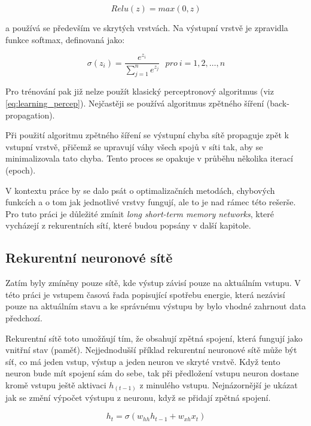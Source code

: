 \documentclass[FM,BP,fonts]{tulthesis}
\begin{document}
\begin{equation}
	Relu(z) = max(0, z)
\end{equation}

a používá se především ve skrytých vrstvách. \cite{brownlee2019gentle} Na výstupní vrstvě je zpravidla funkce softmax, definovaná jako:

\begin{equation}
	\sigma(z_i) = \frac{e^{z_{i}}}{\sum_{j=1}^n e^{z_{j}}} \ \ \ pro\ i=1,2,\dots,n
\end{equation}

Pro trénování pak již nelze použít klasický perceptronový algoritmus (viz \ref{eq:learning_percep}). Nejčastěji se používá algoritmus zpětného šíření (back-propagation).

Při použití algoritmu zpětného šíření se výstupní chyba sítě propaguje zpět k vstupní vrstvě, přičemž se upravují váhy všech spojů v síti tak, aby se minimalizovala tato chyba. Tento proces se opakuje v průběhu několika iterací (epoch).

V kontextu práce by se dalo psát o optimalizačních metodách, chybových funkcích a o tom jak jednotlivé vrstvy fungují, ale to je nad rámec této rešerše. Pro tuto práci je důležité zmínit \textit{long short-term memory networks}, které vycházejí z rekurentních sítí, které budou popsány v další kapitole.


\subsection{Rekurentní neuronové sítě}
Zatím byly zmíněny pouze sítě, kde výstup závisí pouze na aktuálním vstupu. V této práci je vstupem časová řada popisující spotřebu energie, která nezávisí pouze na aktuálním stavu a ke správnému výstupu by bylo vhodné zahrnout data předchozí.

Rekurentní sítě toto umožňují tím, že obsahují zpětná spojení, která fungují jako vnitřní stav (paměť). Nejjednodušší příklad rekurentní neuronové sítě může být síť, co má jeden vstup, výstup a jeden neuron ve skryté vrstvě. Když tento neuron bude mít spojení sám do sebe, tak při předložení vstupu neuron dostane kromě vstupu ještě aktivaci $h_{(t-1)}$ z minulého vstupu. Nejnázornější je ukázat jak se změní výpočet výstupu z neuronu, když se přidají zpětná spojení.


\begin{equation}
	h_t = \sigma(w_{hh}h_{t-1} + w_{xh}x_t)
\end{equation}
\end{document}
